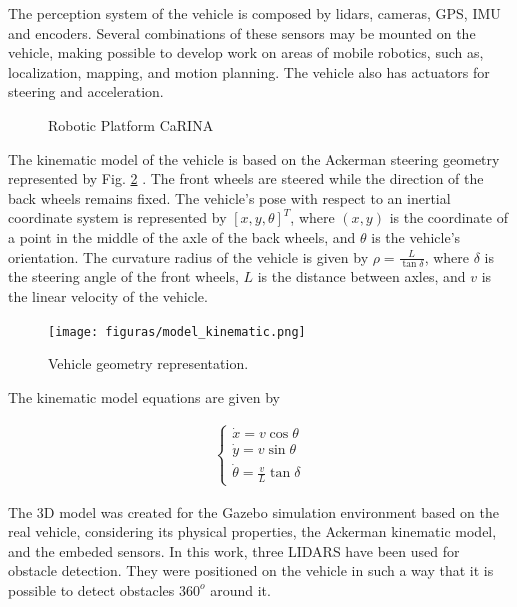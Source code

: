  The perception system of the vehicle is composed by lidars, cameras, GPS, IMU and encoders. 
 Several combinations of these sensors may be mounted on the vehicle, making possible to develop work on areas of mobile robotics, 
 such as, localization, mapping, and motion planning. The vehicle also has actuators for steering and acceleration.
 
 
 \begin{figure}[!h]
     \centering
     \caption{Robotic Platform CaRINA}
 \label{fig:carina}
 \end{figure}
 
 
 The kinematic model of the vehicle is based on the Ackerman steering geometry represented by Fig.  
 \ref{fig:ackerman} \citep{pepy2008}. The front wheels are steered while the direction of the back wheels remains fixed. 
 The vehicle's pose with respect to an inertial coordinate system is represented by  $[x,y,\theta]^T$,  where $(x,y)$ is 
 the coordinate of a point in the middle of the axle of the back wheels, and $\theta$ is the vehicle's orientation. 
 The curvature radius of the vehicle is given by $\rho =\frac{L}{\tan{\delta}}$, where $\delta$ is the steering angle of the 
 front wheels, $L$ is the distance between axles, and $v$ is the linear velocity of the vehicle.
 
 \begin{figure}[!h]
 \centering
 \texttt{[image: figuras/model\_kinematic.png]}
 \caption{Vehicle geometry representation.}\label{fig:ackerman}
 \end{figure}
 
 The kinematic model equations are given by 
   
 \begin{eqnarray}
     \left\{
         \begin{array}{ccc}
             \dot{x} = v \cos \theta 
             \\
             \dot{y} = v \sin \theta 
             \\
             \dot{\theta} =  \frac{v}{L}\tan \delta
         \end{array}
     \right.
 \label{eq1}
 \end{eqnarray}
 
 The 3D model was created for the Gazebo simulation environment \citep{Gazebo}  based on the real vehicle, 
 considering its physical properties, the Ackerman kinematic model, and the embeded sensors. In this work, 
 three LIDARS have been used for obstacle detection. They were positioned on the vehicle in such a way that it is 
 possible to detect obstacles $360^o$ around it.
 

